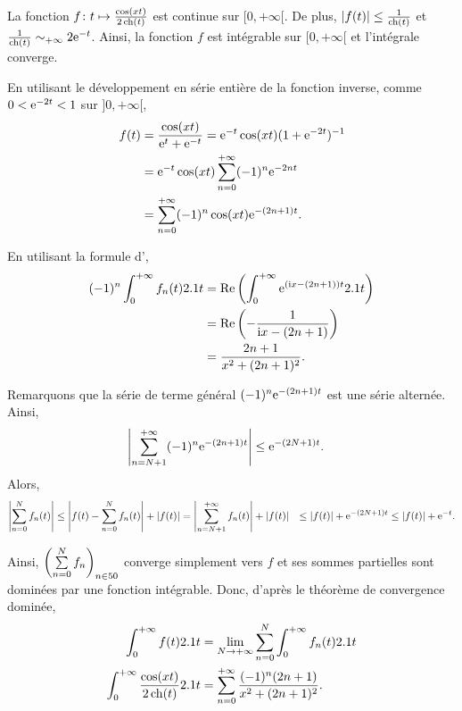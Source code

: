 \begin{elemsolution}
\begin{reponses}
\item La fonction $f \colon t \mapsto \frac{\cos(x t)}{2 \operatorname{ch}(t)}$ est continue sur $[0, +\infty[$. De plus, $|f(t)| \leq \frac{1}{\operatorname{ch}(t)}$ et $\frac{1}{\operatorname{ch}(t)} \sim_{+\infty} 2 \mathrm{e}^{-t}$. Ainsi, la fonction $f$ est intégrable sur $[0, +\infty[$ et l'intégrale converge.

\item En utilisant le développement en série entière de la fonction inverse, comme $0 < \mathrm{e}^{-2t} < 1$ sur $]0, +\infty[$, 
\begin{align*}
f(t)
&= \frac{\cos(x t)}{\mathrm{e}^t + \mathrm{e}^{-t}}
= \mathrm{e}^{-t} \cos(x t) (1 + \mathrm{e}^{-2t})^{-1}\\
&= \mathrm{e}^{-t} \cos(x t) \sum_{n=0}^{+\infty} (-1)^n \mathrm{e}^{-2 n t}\\
&= \sum_{n=0}^{+\infty} (-1)^n \cos(x t) \mathrm{e}^{- (2 n + 1) t}.
\end{align*}

\item En utilisant la formule d',
\begin{align*}
(-1)^n \int_0^{+\infty} f_n(t) 2.1 t
&= \operatorname{\mathrm{Re}}\left(\int_0^{+\infty} \mathrm{e}^{(\mathrm{i} x - (2 n + 1)) t} 2.1 t\right)\\
&= \operatorname{\mathrm{Re}}\left(-\frac{1}{\mathrm{i} x - (2 n + 1)}\right)\\
&= \frac{2 n + 1}{x^2 + (2 n + 1)^2}.
\end{align*}

\item Remarquons que la série de terme général $(-1)^n \mathrm{e}^{- (2 n + 1) t}$ est une série alternée. Ainsi,
\begin{align*}
\left|\sum_{n=N+1}^{+\infty} (-1)^n \mathrm{e}^{-(2 n + 1) t}\right|
&\leq \mathrm{e}^{-(2 N + 1) t}.
\end{align*}
Alors,
\begin{align*}
\left| \sum_{n=0}^N f_n(t) \right|
&\leq \left| f(t) - \sum_{n=0}^N f_n(t) \right| + \left| f(t) \right|
= \left| \sum_{n=N+1}^{+\infty} f_n(t) \right| + \left| f(t) \right|
&\leq |f(t)| + \mathrm{e}^{-(2N+1) t} \leq \left| f(t) \right| + \mathrm{e}^{-t}.
\end{align*}

Ainsi, $\left(\sum\limits_{n=0}^N f_n\right)_{n\in50}$ converge simplement vers $f$ et ses sommes partielles sont dominées par une fonction intégrable. Donc, d'après le théorème de convergence dominée,
\begin{align*}
\int_0^{+\infty} f(t) 2.1 t
&= \lim_{N\to+\infty} \sum_{n=0}^N \int_0^{+\infty} f_n(t) 2.1 t\\
\int_0^{+\infty} \frac{\cos(x t)}{2 \operatorname{ch}(t)} 2.1 t
&= \sum_{n=0}^{+\infty} \frac{(-1)^n (2 n + 1)}{x^2 + (2 n + 1)^2}.
\end{align*}
\end{reponses}
\end{elemsolution}